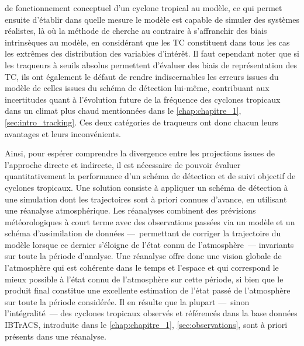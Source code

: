 \documentclass[../main.tex]{subfiles}
\begin{document}
de fonctionnement conceptuel d'un cyclone tropical au modèle, ce qui permet ensuite d'établir dans quelle mesure le modèle est capable de simuler des systèmes
réalistes, là où la méthode de \textcite{camargo_improving_2002} cherche au contraire à s'affranchir des biais intrinsèques au modèle, en considérant que les TC
constituent dans tous les cas les extrêmes des distribution des variables d'intérêt. Il faut cependant noter que si les traqueurs à seuils absolus permettent
d'évaluer des biais de représentation des TC, ils ont également le défaut de rendre indiscernables les erreurs issues du modèle de celles issues du schéma de
détection lui-même, contribuant aux incertitudes quant à l'évolution future de la fréquence des cyclones tropicaux dans un climat plus chaud mentionnées dans le
\cref{chap:chapitre_1}, \cref{sec:intro_tracking}. Ces deux catégories de traqueurs ont donc chacun leurs avantages et leurs inconvénients.

Ainsi, pour espérer comprendre la divergence entre les projections issues de l'approche directe et indirecte, il est nécessaire de pouvoir évaluer
quantitativement la performance d'un schéma de détection et de suivi objectif de cyclones tropicaux. Une solution consiste à appliquer un schéma de détection à
une simulation dont les trajectoires sont à priori connues d'avance, en utilisant une réanalyse atmosphérique. Les réanalyses combinent des prévisions
météorologiques à court terme avec des observations passées via un modèle et un schéma d'assimilation de données ---~permettant de corriger la trajectoire du
modèle lorsque ce dernier s'éloigne de l'état connu de l'atmosphère~--- invariants sur toute la période d'analyse. Une réanalyse offre donc une vision globale
de l'atmosphère qui est cohérente dans le temps et l'espace et qui correspond le mieux possible à l'état connu de l'atmosphère sur cette période, si bien que le
produit final constitue une excellente estimation de l'état passé de l'atmosphère sur toute la période considérée. Il en résulte que la plupart ---~sinon
l'intégralité~--- des cyclones tropicaux observés et référencés dans la base données IBTrACS, introduite dans le \cref{chap:chapitre_1},
\cref{sec:observations}, sont à priori présents dans une réanalyse.
\end{document}
